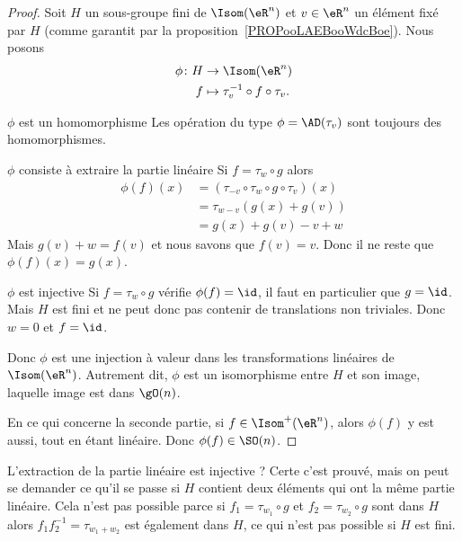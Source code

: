 \begin{proof}
    Soit \( H\) un sous-groupe fini de \( \Isom(\eR^n)\) et \( v\in \eR^n\) un élément fixé par \( H\) (comme garantit par la proposition~\ref{PROPooLAEBooWdcBoe}). Nous posons
    \begin{equation}
        \begin{aligned}
            \phi\colon H&\to \Isom(\eR^n) \\
            f&\mapsto \tau_v^{-1}\circ f\circ \tau_v.
        \end{aligned}
    \end{equation}

    \begin{subproof}
        \item[\( \phi\) est un homomorphisme]
            Les opération du type \( \phi=\AD(\tau_v)\) sont toujours des homomorphismes.
        \item[\( \phi\) consiste à extraire la partie linéaire]
            Si \( f=\tau_w\circ g\) alors
            \begin{subequations}
                \begin{align}
                    \phi(f)(x)&=(\tau_{-v}\circ\tau_w\circ g\circ\tau_v)(x)\\
                    &=\tau_{w-v}(   g(x)+g(v)  )\\
                    &=g(x)+g(v)-v+w
                \end{align}
            \end{subequations}
            Mais \( g(v)+w=f(v)\) et nous savons que \( f(v)=v\). Donc il ne reste que \( \phi(f)(x)=g(x)\).
        \item[\( \phi\) est injective]
            Si \( f=\tau_w\circ g\) vérifie \( \phi(f)=\id\), il faut en particulier que \( g=\id\). Mais \( H\) est fini et ne peut donc pas contenir de translations non triviales. Donc \( w=0\) et \( f=\id\).
    \end{subproof}
    Donc \( \phi\) est une injection à valeur dans les transformations linéaires de \( \Isom(\eR^n)\). Autrement dit, \( \phi\) est un isomorphisme entre \( H\) et son image, laquelle image est dans \( \gO(n)\).

    En ce qui concerne la seconde partie, si \( f\in\Isom^+(\eR^n)\), alors \( \phi(f)\) y est aussi, tout en étant linéaire. Donc \( \phi(f)\in \SO(n)\).
\end{proof}

L'extraction de la partie linéaire est injective ? Certe c'est prouvé, mais on peut se demander ce qu'il se passe si \( H\) contient deux éléments qui ont la même partie linéaire. Cela n'est pas possible parce si \( f_1=\tau_{w_1}\circ g\) et \( f_2=\tau_{w_2}\circ g\) sont dans \( H\) alors \( f_1f_2^{-1}=\tau_{w_1+w_2}\) est également dans \( H\), ce qui n'est pas possible si \( H\) est fini.

